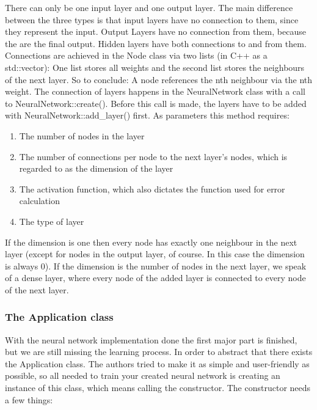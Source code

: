 There can only be one input layer and one output layer. The main difference between the three types is that input layers have no connection to them, since they represent the input. Output Layers have no connection from them, because the are the final output. Hidden layers have both connections to and from them. Connections are achieved in the Node class via two lists (in C++ as a std::vector): One list stores all weights and the second list stores the neighbours of the next layer. 
\newline
So to conclude: A node references the nth neighbour via the nth weight. The connection of layers happens in the NeuralNetwork class with a call to NeuralNetwork::create(). Before this call is made, the layers have to be added with NeuralNetwork::add\_layer() first. As parameters this method requires:

\newpage

\begin{enumerate}
	\item The number of nodes in the layer
	\item The number of connections per node to the next layer's nodes, which is regarded to as the dimension of the layer
	\item The activation function, which also dictates the function used for error calculation
	\item The type of layer
\end{enumerate}
	
If the dimension is one then every node has exactly one neighbour in the next layer (except for nodes in the output layer, of course. In this case the dimension is always 0). If the dimension is the number of nodes in the next layer, we speak of a dense layer, where every node of the added layer is connected to every node of the next layer.

\subsubsection{The Application class}

With the neural network implementation done the first major part is finished, but we are still missing the learning process. In order to abstract that there exists the Application class. The authors tried to make it as simple and user-friendly as possible, so all needed to train your created neural network is creating an instance of this class, which means calling the constructor. The constructor needs a few things: 


